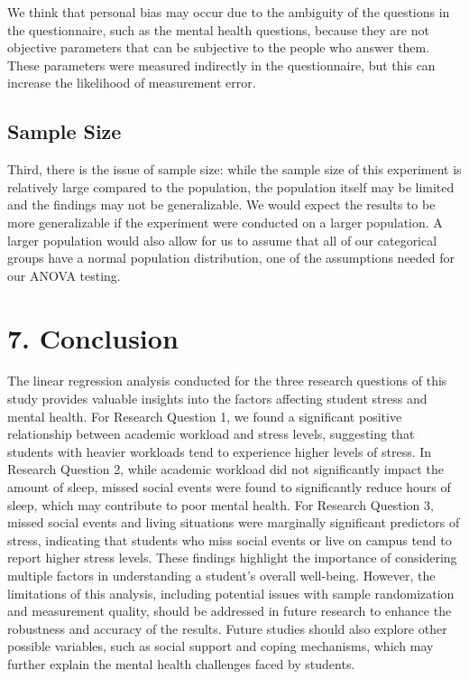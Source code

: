 \documentclass[
  letterpaper,
  DIV=11,
  numbers=noendperiod]{scrartcl}
\begin{document}
We think that personal bias may occur due to the ambiguity of the
questions in the questionnaire, such as the mental health questions,
because they are not objective parameters that can be subjective to the
people who answer them. These parameters were measured indirectly in the
questionnaire, but this can increase the likelihood of measurement
error.

\subsection{Sample Size}\label{sample-size-1}

Third, there is the issue of sample size: while the sample size of this
experiment is relatively large compared to the population, the
population itself may be limited and the findings may not be
generalizable. We would expect the results to be more generalizable if
the experiment were conducted on a larger population. A larger
population would also allow for us to assume that all of our categorical
groups have a normal population distribution, one of the assumptions
needed for our ANOVA testing.

\section{7. Conclusion}\label{conclusion}

The linear regression analysis conducted for the three research
questions of this study provides valuable insights into the factors
affecting student stress and mental health. For Research Question 1, we
found a significant positive relationship between academic workload and
stress levels, suggesting that students with heavier workloads tend to
experience higher levels of stress. In Research Question 2, while
academic workload did not significantly impact the amount of sleep,
missed social events were found to significantly reduce hours of sleep,
which may contribute to poor mental health. For Research Question 3,
missed social events and living situations were marginally significant
predictors of stress, indicating that students who miss social events or
live on campus tend to report higher stress levels. These findings
highlight the importance of considering multiple factors in
understanding a student's overall well-being. However, the limitations
of this analysis, including potential issues with sample randomization
and measurement quality, should be addressed in future research to
enhance the robustness and accuracy of the results. Future studies
should also explore other possible variables, such as social support and
coping mechanisms, which may further explain the mental health
challenges faced by students.
\end{document}
